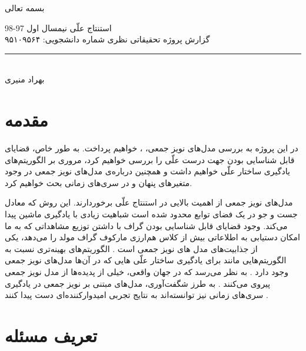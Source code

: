 \documentclass[a4paper,12pt]{article}
\begin{document}
\begin{center}
بسمه تعالی
\end{center}
\begin{large}
استنتاج علّی
\hspace{10.3cm}
نیمسال اول 97-98
\\
گزارش پروژه تحقیقاتی نظری\hspace{8cm}  شماره دانشجویی:  ۹۵۱۰۹۵۶۴
\end{large}

\noindent\rule{\textwidth}{1pt}
\begin{center}
\begin{large}
\textbf{}\\
\vspace{0.5cm}
بهراد منیری
\end{large}
\end{center}
\tableofcontents

\section{مقدمه}
در این پروژه به بررسی مدل‌های نویز جمعی،
،
خواهیم پرداخت. به طور خاص، قضایای قابل شناسایی بودن جهت درست علّی  را بررسی خواهیم کرد، مروری بر الگوریتم‌های یادگیری  ساختار‌ علّی خواهیم داشت و همچنین درباره‌ی مدل‌های نویز جمعی در وجود متغیر‌های پنهان و در سری‌های زمانی بحث خواهیم کرد. 

مدل‌های نویز جمعی از اهمیت بالایی در استنتاج علّی برخوردارند.  این روش که معادل جست‌ و جو در یک فضای توابع محدود شده است شباهیت زیادی با یادگیری ماشین پیدا می‌کند. وجود  قضایای قابل شناسایی بودن گراف  با داشتن توزیع مشاهداتی که به ما امکان دستیابی به اطلاعاتی بیش از کلاس هم‌ارزی مارکوف گراف مولد را می‌دهد، یکی از جذابیت‌های مدل های نویز جمعی است
\cite{hoyer}.
الگوریتم‌های بهینه‌تری نسبت به الگوریتم‌هایی مانند 
برای یادگیری ساختار علّی 
هایی که در آن‌ها مدل‌های نویز جمعی وجود دارد 
\cite{continous}.
به نظر می‌رسد که در جهان واقعی، خیلی از پدیده‌ها از مدل‌ نویز جمعی پیروی می‌کنند
\cite{continous, postnonlinear}.
 به طرز شگفت‌آوری، مدل‌های مبتنی بر نویز جمعی در یادگیری سری‌های زمانی نیز توانسته‌اند به نتایج تجربی امیدوارکننده‌ای دست پیدا کنند
\cite{time}.


\section{تعریف مسئله}
\end{document}
